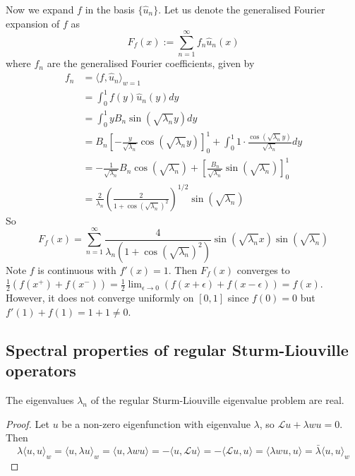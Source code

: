 \begin{example}
	Now we expand $f$ in the basis $\{ \hat{u}_n \}$. Let us denote the generalised Fourier expansion of $f$ as
	\[
		F_f(x) := \sum_{n = 1}^{\infty} f_n \hat{u}_n(x)
	\]
	where $f_n$ are the generalised Fourier coefficients, given by
	\[
		\begin{aligned}
			f_n & = {\langle f, \hat{u}_n \rangle}_{w = 1} \\
			& = \int_{0}^{1} f(y) \hat{u}_n(y) dy \\
			& = \int_{0}^{1} y B_n \sin(\sqrt{\lambda_n} y) dy \\
			& = B_n \left[ -\frac{y}{\sqrt{\lambda_n}} \cos(\sqrt{\lambda_n} y) \right]_0^1 + \int_{0}^{1} 1 \cdot \frac{\cos(\sqrt{\lambda_n} y)}{\sqrt{\lambda_n}} dy \\
			& = -\frac{1}{\sqrt{\lambda_n}} B_n \cos(\sqrt{\lambda_n}) + \left[ \frac{B_n}{\sqrt{\lambda_n}} \sin(\sqrt{\lambda_n}) \right]_0^1 \\
			& = \frac{2}{\lambda_n} {\left( \frac{2}{1 + {\cos(\sqrt{\lambda_n})}^2} \right)}^{1 / 2} \sin(\sqrt{\lambda_n})
		\end{aligned}
	\]
	So
	\[
		F_f(x) = \sum_{n = 1}^{\infty} \frac{4}{\lambda_n (1 + {\cos(\sqrt{\lambda_n})}^2)} \sin(\sqrt{\lambda_n} x) \sin(\sqrt{\lambda_n})
	\]
	Note $f$ is continuous with $f'(x) = 1$. Then $F_f(x)$ converges to $\frac{1}{2} (f(x^+) + f(x^-)) = \frac{1}{2} \lim_{\epsilon \to 0} (f(x + \epsilon) + f(x - \epsilon)) = f(x)$. However, it does not converge uniformly on $[0, 1]$ since $f(0) = 0$ but $f'(1) + f(1) = 1 + 1 \ne 0$.
\end{example}

\subsection{Spectral properties of regular Sturm-Liouville operators}

\begin{proposition}\label{prop:slRealEigenvalues}
	The eigenvalues $\lambda_n$ of the regular Sturm-Liouville eigenvalue problem are real.
\end{proposition}

\begin{proof}
	Let $u$ be a non-zero eigenfunction with eigenvalue $\lambda$, so $\mathcal{L} u + \lambda w u = 0$. Then
	\[
		\lambda {\langle u, u \rangle}_w = {\langle u, \lambda u \rangle}_w = \langle u, \lambda w u \rangle = -\langle u, \mathcal{L} u \rangle = -\langle \mathcal{L} u, u \rangle = \langle \lambda w u, u \rangle = \bar{\lambda} {\langle u, u \rangle}_w
	\]
\end{proof}


